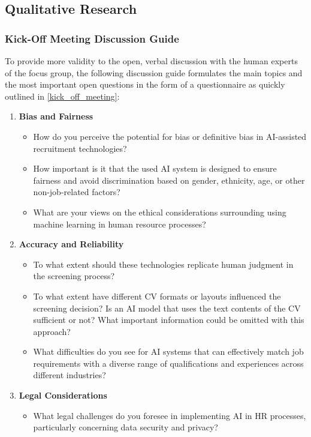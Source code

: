 \documentclass[draft,final]{thesisclass} %
\begin{document}
\subsection{Qualitative Research}

\subsubsection{Kick-Off Meeting Discussion Guide}
To provide more validity to the open, verbal discussion with the human experts of the focus group, the following discussion guide formulates the main topics and the most important open questions in the form of a questionnaire as quickly outlined in \ref{kick_off_meeting}:
\begin{enumerate}
    \item \textbf{Bias and Fairness}
    \begin{itemize}
        \item How do you perceive the potential for bias or definitive bias in \acs{AI}-assisted recruitment technologies?
        \item How important is it that the used \acs{AI} system is designed to ensure fairness and avoid discrimination based on gender, ethnicity, age, or other non-job-related factors?
        \item What are your views on the ethical considerations surrounding using machine learning in human resource processes?
    \end{itemize}
    \item \textbf{Accuracy and Reliability}
    \begin{itemize}
        \item To what extent should these technologies replicate human judgment in the screening process?
        \item To what extent have different \acs{CV} formats or layouts influenced the screening decision? Is an \acs{AI} model that uses the text contents of the \acs{CV} sufficient or not? What important information could be omitted with this approach?
        \item What difficulties do you see for \acs{AI} systems that can effectively match job requirements with a diverse range of qualifications and experiences across different industries?
    \end{itemize}
    \item \textbf{Legal Considerations}
    \begin{itemize}
        \item What legal challenges do you foresee in implementing \acs{AI} in \acs{HR} processes, particularly concerning data security and privacy?

\end{itemize}
\end{enumerate}
\end{document}
